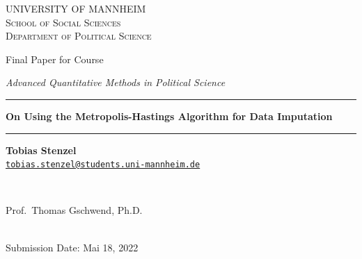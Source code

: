 \documentclass[12pt,english,a4paper,oneside]{article}
\theoremstyle{definition}
\theoremstyle{definition}
\theoremstyle{definition}
\theoremstyle{definition}
\theoremstyle{remark}
\begin{document}
\begin{titlepage}

    \begin{center}
    \large{ \textsc{ \uppercase{University of Mannheim} \\ \vspace{-0.2cm}
School of Social Sciences \\ \vspace{-0.2cm}
Department of Political Science}}

      
        \vspace{3.5cm}
        

       \large{   Final Paper for Course   }


       \large{ \textit{   Advanced Quantitative Methods in Political Science   }}

\renewcommand{\linethickness}{0.03em}
\rule{\linewidth}{\linethickness}


       \LARGE{ \textbf{   On Using the Metropolis-Hastings Algorithm for Data Imputation   }}


       \large{  }

        \vspace{-0.2cm}
\rule{\linewidth}{\linethickness}


\begin{minipage}[t]{0.5\textwidth}
\begin{flushleft}
\singlespacing
 \textbf{Tobias Stenzel}  \\ 


 \href{mailto:tobias.stenzel@students.uni-mannheim.de}{\nolinkurl{tobias.stenzel@students.uni-mannheim.de}}  \\ 

\end{flushleft}
\end{minipage}
\begin{minipage}[t]{0.4\textwidth}
\hfill
\end{minipage}\\
\vspace{0.2cm}
\begin{minipage}[t]{0.35\textwidth}
\hfill
\end{minipage}
\begin{minipage}[t]{0.55\textwidth}
\begin{flushright}
\singlespacing
     Prof.~Thomas Gschwend, Ph.D.  \\       

\end{flushright}
\end{minipage}\\
%


         \vfill
         Submission Date: Mai 18, 2022 \\ 
        





         \vfill



     \end{center}
    \thispagestyle{empty}
\end{titlepage}
\end{document}
